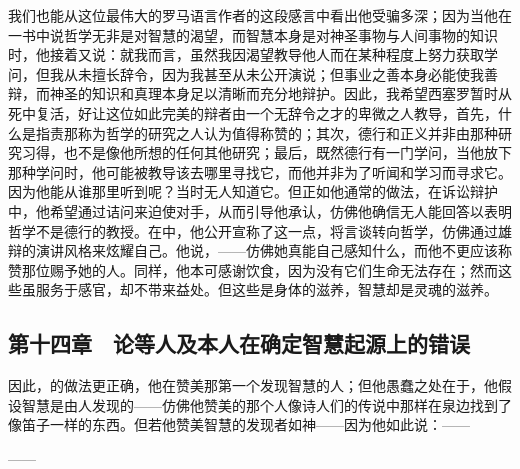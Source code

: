我们也能从这位最伟大的罗马语言作者的这段感言中看出他受骗多深；因为当他在一书中说哲学无非是对智慧的渴望，而智慧本身是对神圣事物与人间事物的知识时，他接着又说：就我而言，虽然我因渴望教导他人而在某种程度上努力获取学问，但我从未擅长辞令，因为我甚至从未公开演说；但事业之善本身必能使我善辩，而神圣的知识和真理本身足以清晰而充分地辩护。因此，我希望西塞罗暂时从死中复活，好让这位如此完美的辩者由一个无辞令之才的卑微之人教导，首先，什么是指责那称为哲学的研究之人认为值得称赞的；其次，德行和正义并非由那种研究习得，也不是像他所想的任何其他研究；最后，既然德行有一门学问，当他放下那种学问时，他可能被教导该去哪里寻找它，而他并非为了听闻和学习而寻求它。因为他能从谁那里听到呢？当时无人知道它。但正如他通常的做法，在诉讼辩护中，他希望通过诘问来迫使对手，从而引导他承认，仿佛他确信无人能回答以表明哲学不是德行的教授。在中，他公开宣称了这一点，将言谈转向哲学，仿佛通过雄辩的演讲风格来炫耀自己。他说，——仿佛她真能自己感知什么，而他不更应该称赞那位赐予她的人。同样，他本可感谢饮食，因为没有它们生命无法存在；然而这些虽服务于感官，却不带来益处。但这些是身体的滋养，智慧却是灵魂的滋养。\par


\subsection{第十四章　论等人及本人在确定智慧起源上的错误}

因此，的做法更正确，他在赞美那第一个发现智慧的人；但他愚蠢之处在于，他假设智慧是由人发现的——仿佛他赞美的那个人像诗人们的传说中那样在泉边找到了像笛子一样的东西。但若他赞美智慧的发现者如神——因为他如此说：——\par

——\par

